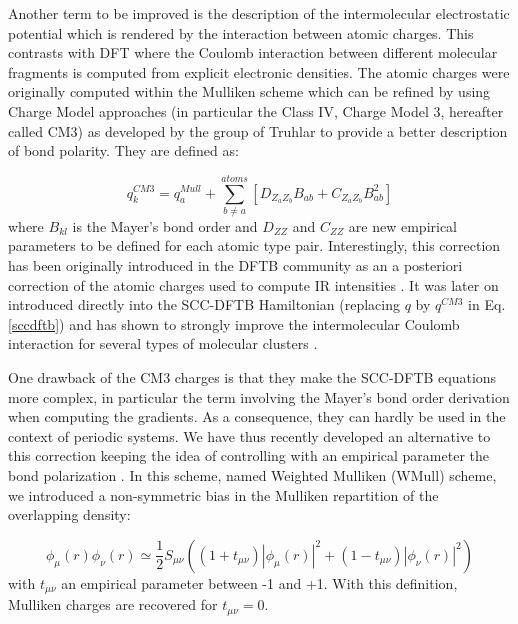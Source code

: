 \documentclass[]{interact}
\theoremstyle{plain}%
\theoremstyle{definition}
\theoremstyle{remark}
\begin{document}
Another term to be improved is the description of the intermolecular electrostatic potential which  is rendered by the
interaction between atomic charges. This contrasts with DFT where the Coulomb interaction between different molecular
fragments is computed from explicit electronic densities. The atomic charges were originally  computed within the Mulliken
scheme which can be refined by using Charge Model approaches (in particular the Class IV, Charge Model 3, hereafter called CM3)
as developed by the group of Truhlar \cite{Li_CM3} to provide a better description of bond polarity. They are defined as: 

\begin{equation}
q^{CM3}_k=q^{Mull}_a+\sum_{b\neq a}^{atoms} [ D_{Z_a Z_{b}}B_{ab}+ C_{Z_a Z_{b}}B_{ab}^2]
\label{qcm3}
\end{equation}
where $B_{kl}$ is the Mayer's bond order and $D_{ZZ}$ and $C_{ZZ}$ are new empirical parameters to be defined for  each atomic type pair. Interestingly, this correction has been originally introduced in the DFTB community as an a posteriori correction of the atomic charges used to compute IR intensities \cite{Kalinowski_dftbcm,joalland2010}. It was later on introduced directly into the SCC-DFTB Hamiltonian (replacing $q$ by $q^{CM3}$ in Eq. \ref{sccdftb}) and has shown to strongly improve the intermolecular Coulomb interaction for several types of molecular clusters \cite{DFTB_CM3,DFTB_Mathias2012}. 

One drawback of the CM3 charges is that they make the SCC-DFTB equations more complex, in particular the term involving the Mayer's bond order derivation when computing the gradients.  As a consequence, they can hardly be used in the context of periodic systems. We have thus recently developed an alternative to this correction keeping the idea of controlling with an empirical parameter the bond polarization \cite{Michoulier18b}. In this scheme,  named Weighted Mulliken (WMull) scheme, we introduced a non-symmetric bias in the Mulliken repartition of the overlapping density:

 \begin{equation}
\label{Eq:wmull}
\phi_\mu(r)\phi_\nu(r)\simeq \frac{1}{2} S_{\mu\nu} ((1+t_{\mu\nu}) |\phi_\mu(r)|^2+ (1-t_{\mu\nu})|\phi_\nu(r)|^2) 
\end{equation}
with $t_{\mu\nu}$ an empirical parameter between -1 and +1. With this definition, Mulliken charges are recovered for $t_{\mu\nu}=0$.
\end{document}
